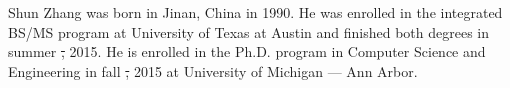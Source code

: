 \documentclass[12pt]{report}	%
\theoremstyle{definition}
\theoremstyle{remark}
\providecommand{\DIFdel}[1]{{\protect\color{red}\sout{#1}}}                      %
\providecommand{\DIFdelbegin}{} %
\providecommand{\DIFdelend}{} %
\begin{document}
\printindex%



\begin{vita}
Shun Zhang was born in Jinan, China in 1990. He was enrolled in the integrated
BS/MS program at University of Texas at Austin and finished both degrees in
summer \DIFdelbegin \DIFdel{, }\DIFdelend 2015. He is enrolled in the Ph.D. program in Computer Science and
Engineering in fall \DIFdelbegin \DIFdel{, }\DIFdelend 2015 at University of Michigan --- Ann Arbor.
\end{vita}
\end{document}
